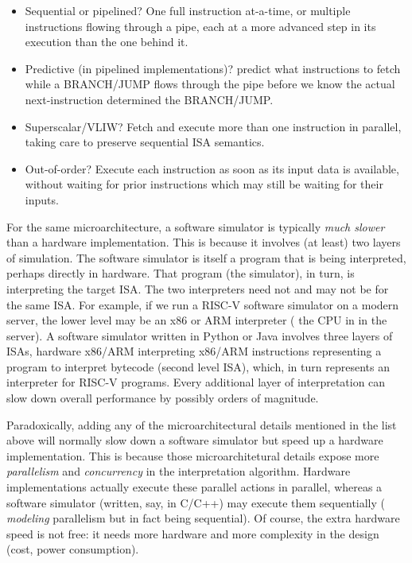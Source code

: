 \begin{itemize}

  \item Sequential or pipelined?  One full instruction at-a-time, or
    multiple instructions flowing through a pipe, each at a more
    advanced step in its execution than the one behind it.

  \item Predictive (in pipelined implementations)?  {\Eg} predict what
    instructions to fetch while a BRANCH/JUMP flows through the pipe
    before we know the actual next-instruction determined the
    BRANCH/JUMP.

  \item Superscalar/VLIW? Fetch and execute more than one instruction
    in parallel, taking care to preserve sequential ISA semantics.

  \item Out-of-order? Execute each instruction as soon as its input
    data is available, without waiting for prior instructions which
    may still be waiting for their inputs.

\end{itemize}

For the same microarchitecture, a software simulator is typically
\emph{much slower} than a hardware implementation.  This is because it
involves (at least) two layers of simulation.  The software simulator
is itself a program that is being interpreted, perhaps directly in
hardware.  That program (the simulator), in turn, is interpreting the
target ISA.  The two interpreters need not and may not be for the same
ISA.  For example, if we run a RISC-V software simulator on a modern
server, the lower level may be an x86 or ARM interpreter ({\ie} the
CPU in in the server).  A software simulator written in Python or Java
involves three layers of ISAs, {\eg} hardware x86/ARM interpreting
x86/ARM instructions representing a program to interpret bytecode
(second level ISA), which, in turn represents an interpreter for
RISC-V programs.  Every additional layer of interpretation can slow
down overall performance by possibly orders of magnitude.

Paradoxically, adding any of the microarchitectural details mentioned
in the list above will normally slow down a software simulator but
speed up a hardware implementation.  This is because those
microarchitetural details expose more \emph{parallelism} and
\emph{concurrency} in the interpretation algorithm.  Hardware
implementations actually execute these parallel actions in parallel,
whereas a software simulator (written, say, in C/C++) may execute them
sequentially ({\ie} \emph{modeling} parallelism but in fact being
sequential).  Of course, the extra hardware speed is not free: it
needs more hardware and more complexity in the design (cost, power
consumption).

